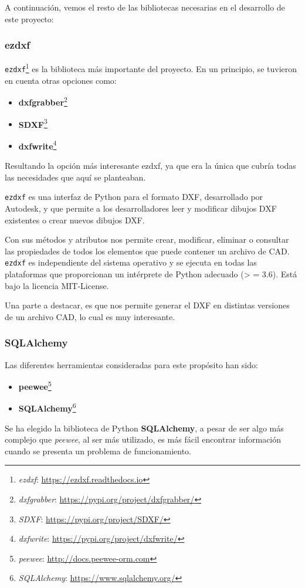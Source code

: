 A continuación, vemos el resto de las bibliotecas necesarias en el desarrollo de este proyecto:


\subsubsection{ezdxf}

\texttt{ezdxf}\footnote{\textsl{ezdxf}: \url{ https://ezdxf.readthedocs.io}} es la biblioteca más importante del proyecto. En un principio, se tuvieron en cuenta otras opciones como:
\begin{itemize}
\item \textbf{dxfgrabber}\footnote{\textsl{dxfgrabber}: \url{https://pypi.org/project/dxfgrabber/}}
\item \textbf{SDXF}\footnote{\textsl{SDXF}: \url{https://pypi.org/project/SDXF/}}
\item \textbf{dxfwrite}\footnote{\textsl{dxfwrite}: \url{https://pypi.org/project/dxfwrite/}}
\end{itemize}

Resultando la opción más interesante ezdxf, ya que era la única que cubría todas las necesidades que aquí se planteaban.

\texttt{ezdxf} es una interfaz de Python para el formato DXF, desarrollado por Autodesk, y que permite a los desarrolladores leer y modificar dibujos DXF existentes o crear nuevos dibujos DXF.

Con sus métodos y atributos nos permite crear, modificar, eliminar o consultar las propiedades de todos los elementos que puede contener un archivo de CAD.
\texttt{ezdxf} es independiente del sistema operativo y se ejecuta en todas las plataformas que proporcionan un intérprete de Python adecuado (> = 3.6). Está bajo la licencia MIT-License.

Una parte a destacar, es que nos permite generar el DXF en distintas versiones de un archivo CAD, lo cual es muy interesante. 


\subsubsection{SQLAlchemy}
Las diferentes herramientas consideradas para este propósito han sido:

\begin{itemize}
\item \textbf{peewee}\footnote{\textsl{peewee}: \url{http://docs.peewee-orm.com}}
\item \textbf{SQLAlchemy}\footnote{\textsl{SQLAlchemy}: \url{https://www.sqlalchemy.org/}}
\end{itemize}
Se ha elegido la biblioteca de Python \textbf{SQLAlchemy}, a pesar de ser algo más complejo que \emph{peewee}, al ser más utilizado, es más fácil encontrar información cuando se presenta un problema de funcionamiento.

